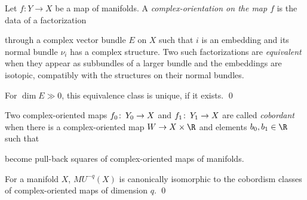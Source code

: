 \begin{definition}
Let $f: Y \to X$ be a map of manifolds.  A \textit{complex-orientation on the map $f$} is the data of a factorization
\begin{center}
\end{center}
through a complex vector bundle $E$ on $X$ such that $i$ is an embedding and its normal bundle $\nu_i$ has a complex structure.  Two such factorizations are \textit{equivalent} when they appear as subbundles of a larger bundle and the embeddings are isotopic, compatibly with the structures on their normal bundles.
\end{definition}
\begin{lemma}
For $\dim E \gg 0$, this equivalence class is unique, if it exists. \qed
\end{lemma} 
\begin{definition}
Two complex-oriented maps $f_0\colon\thinspace Y_0 \to X$ and $f_1\colon\thinspace Y_1 \to X$ are called \textit{cobordant} when there is a complex-oriented map $W \to X \times \R$ and elements $b_0, b_1 \in \R$ such that
\begin{center}
\end{center}
become pull-back squares of complex-oriented maps of manifolds.
\end{definition}

\begin{theorem}[Thom]
For a manifold $X$, $MU^{-q}(X)$ is canonically isomorphic to the cobordism classes of complex-oriented maps of dimension $q$. \qed {}
\end{theorem}

